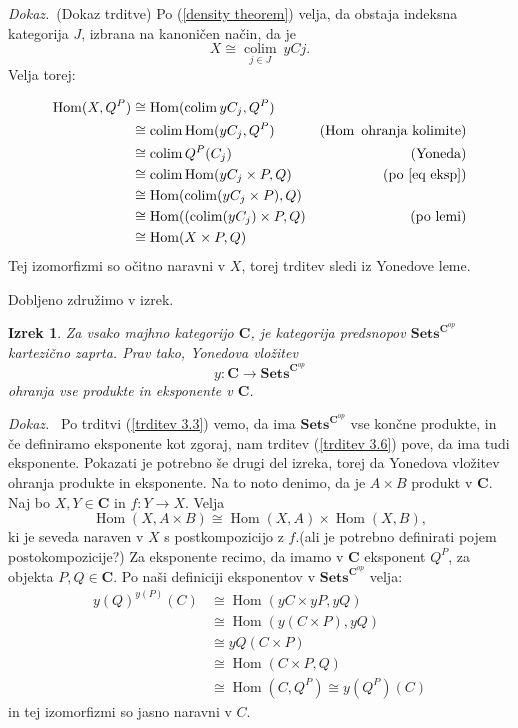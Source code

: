 \documentclass[12pt,a4paper]{book}
\theoremstyle{definition}
\theoremstyle{plain}
\newtheorem{izrek}[definicija]{Izrek}
\newenvironment{dokaz}{\emph{Dokaz.}\ }{\hspace{\fill}{$\Box$}}
\theoremstyle{definition}
\theoremstyle{remark}
\newcommand{\cat}[1]{\textbf{#1}}
\DeclareMathOperator{\Hom}{Hom}
\DeclareMathOperator{\colim}{colim}
\newcommand{\predsnop}[1]{\cat{Sets}^{\cat{#1}^{op}}}
\begin{document}
\begin{dokaz}(Dokaz trditve)
Po (\ref{density theorem}) velja, da obstaja indeksna kategorija $J$, izbrana na kanoničen način, da je
$$ X \cong \underset{j \in J}{\colim}\> yCj.$$
Velja torej:

\begin{align*}
\Hom(X, Q^P) &\cong \Hom(\colim yC_j, Q^P) & \\
&\cong \colim\Hom(yC_j, Q^P) & (\Hom \text{ ohranja kolimite}) \\
&\cong \colim Q^P(C_j) & (\text{Yoneda}) \\
&\cong \colim \Hom(yC_j \times P, Q) & (\text{po \ref{eq eksp}}) \\
&\cong \Hom(\colim(yC_j \times P), Q) & \\
&\cong \Hom((\colim(yC_j) \times P, Q) & (\text{po lemi}) \\
&\cong \Hom(X \times P, Q) \\
\end{align*}
Tej izomorfizmi so očitno naravni v $X$, torej trditev sledi iz Yonedove leme.
\end{dokaz}

Dobljeno združimo v izrek.

\begin{izrek}
Za vsako majhno kategorijo $\cat{C}$, je kategorija predsnopov $\predsnop{C}$ kartezično zaprta. Prav tako, Yonedova vložitev
$$y : \cat{C} \to \predsnop{C}$$
ohranja vse produkte in eksponente v $\cat{C}$.
\end{izrek}
\begin{dokaz}
Po trditvi (\ref{trditev 3.3}) vemo, da ima $\predsnop{C}$ vse končne produkte, in če definiramo eksponente kot zgoraj, nam trditev (\ref{trditev 3.6}) pove, da ima tudi eksponente.
Pokazati je potrebno še drugi del izreka, torej da Yonedova vložitev ohranja produkte in eksponente. Na to noto denimo, da je $A \times B$ produkt v $\cat{C}$.
Naj bo $X,Y \in \cat{C}$ in $f : Y \to X$. Velja
$$ \Hom(X, A\times B) \cong \Hom(X, A) \times \Hom(X,B),$$
ki je seveda naraven v $X$ s postkompozicijo z $f$.(ali je potrebno definirati pojem postokompozicije?)
Za eksponente recimo, da imamo v $\cat{C}$ eksponent $Q^P$, za objekta $P,Q \in \cat{C}$. Po naši definiciji eksponentov v $\predsnop{C}$ velja:
\begin{align*}
y(Q)^{y(P)}(C) & \cong \Hom(yC \times yP, yQ) \\
&\cong \Hom(y(C \times P), yQ) \\
&\cong yQ(C \times P) \\
&\cong \Hom(C \times P, Q) \\
&\cong \Hom(C, Q^P) \cong y(Q^P)(C)
\end{align*}
in tej izomorfizmi so jasno naravni v $C$.
\end{dokaz}
\end{document}
